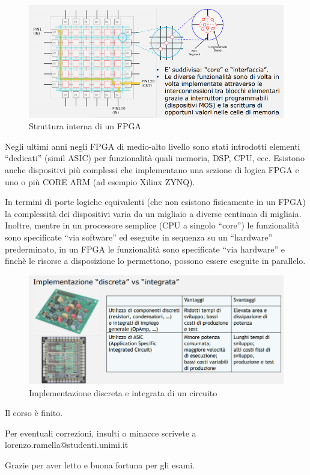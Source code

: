 \documentclass{article}
\begin{document}
\begin{figure}[h]
  \centering
  \includegraphics[scale=0.48]{IM_FPGA_struttura}
  \caption{Struttura interna di un FPGA}
  \label{FPGA_struttura}
\end{figure}

Negli ultimi anni negli FPGA di medio-alto livello sono stati introdotti elementi “dedicati” (simil ASIC) per funzionalità quali memoria, DSP, CPU, ecc. 
Esistono anche dispositivi più complessi che implementano una sezione di logica FPGA e uno o più CORE ARM (ad esempio Xilinx ZYNQ). 

\vspace{1mm}

In termini di porte logiche equivalenti (che non esistono fisicamente in un FPGA) la complessità dei dispositivi varia da un migliaio a diverse centinaia di migliaia.
Inoltre, mentre in un processore semplice (CPU a singolo “core”) le funzionalità sono specificate “via software” ed eseguite in sequenza su un “hardware” prederminato, in un FPGA le funzionalità sono specificate “via hardware” e finchè le risorse a disposizione lo permettono, possono essere eseguite in parallelo.

\begin{figure}[h]
  \centering
  \includegraphics[scale=0.5]{IM_discreta_vs_integrata}
  \caption{Implementazione discreta e integrata di un circuito}
  \label{discreta_vs_integrata}
\end{figure}

\clearpage

\hspace{0pt}
\vfill
\begin{center}
Il corso è finito. 

Per eventuali correzioni, insulti o minacce scrivete a lorenzo.ramella@studenti.unimi.it

Grazie per aver letto e buona fortuna per gli esami.
\end{center}
\vfill
\hspace{0pt}
\end{document}
